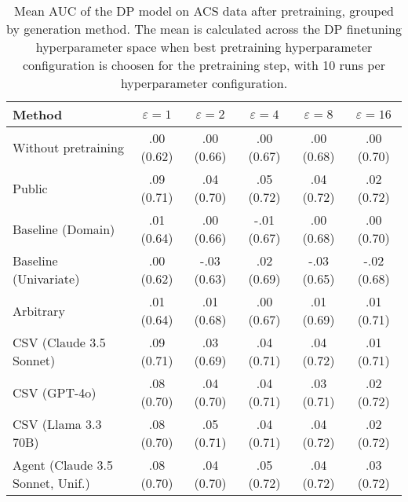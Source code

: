 \begin{table}[h!]
    \centering
    \caption{Mean AUC of the DP model on ACS data after pretraining, grouped by generation method. The mean is calculated across the DP finetuning hyperparameter space when best pretraining hyperparameter configuration is choosen for the pretraining step, with 10 runs per hyperparameter configuration.}
    \label{tab:epsilon_comparison}
    \begin{tabular}{lccccc}
    \toprule
    Method & $\varepsilon=1$ & $\varepsilon=2$ & $\varepsilon=4$ & $\varepsilon=8$ & $\varepsilon=16$ \\
    \midrule
    Without pretraining & .00 {\small (0.62)} & .00 {\small (0.66)} & .00 {\small (0.67)} & .00 {\small (0.68)} & .00 {\small (0.70)} \\
    \arrayrulecolor{black!50!}\midrule
    Public & \cellcolor{bronze!30}.09 {\small (0.71)} & \cellcolor{bronze!30}.04 {\small (0.70)} & \cellcolor{bronze!30}.05 {\small (0.72)} & .04 {\small (0.72)} & .02 {\small (0.72)} \\
    \arrayrulecolor{black!50!}\midrule
    Baseline (Domain) & .01 {\small (0.64)} & .00 {\small (0.66)} & -.01 {\small (0.67)} & .00 {\small (0.68)} & .00 {\small (0.70)} \\
    Baseline (Univariate) & .00 {\small (0.62)} & -.03 {\small (0.63)} & .02 {\small (0.69)} & -.03 {\small (0.65)} & -.02 {\small (0.68)} \\
    \arrayrulecolor{black!50!}\midrule
    Arbitrary & .01 {\small (0.64)} & .01 {\small (0.68)} & .00 {\small (0.67)} & .01 {\small (0.69)} & .01 {\small (0.71)} \\
    \arrayrulecolor{black!50!}\midrule
    CSV (Claude 3.5 Sonnet) & \cellcolor{silver!30}.09 {\small (0.71)} & .03 {\small (0.69)} & .04 {\small (0.71)} & \cellcolor{bronze!30}.04 {\small (0.72)} & .01 {\small (0.71)} \\
    CSV (GPT-4o) & .08 {\small (0.70)} & .04 {\small (0.70)} & .04 {\small (0.71)} & .03 {\small (0.71)} & \cellcolor{silver!30}.02 {\small (0.72)} \\
    CSV (Llama 3.3 70B) & .08 {\small (0.70)} & \cellcolor{gold!30}.05 {\small (0.71)} & .04 {\small (0.71)} & .04 {\small (0.72)} & \cellcolor{bronze!30}.02 {\small (0.72)} \\
    \arrayrulecolor{black!50!}\midrule
    Agent (Claude 3.5 Sonnet, Unif.) & .08 {\small (0.70)} & .04 {\small (0.70)} & \cellcolor{gold!30}.05 {\small (0.72)} & \cellcolor{silver!30}.04 {\small (0.72)} & \cellcolor{gold!30}.03 {\small (0.72)} \\

\end{tabular}
\end{table}
